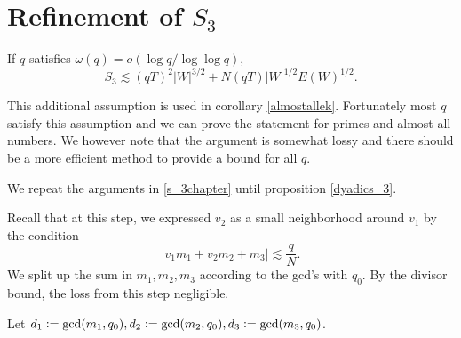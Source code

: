 \section{Refinement of $S_3$}

\begin{proposition} \label{s3refined}
   If $q$ satisfies $\omega(q)=o(\log q /\log\log q)$,
    \[
S_3 \lesssim (qT)^{2}| W|^{3/2}+N(qT)| W|^{1/2}E( W)^{1/2}.
\]
\end{proposition}
\begin{remark}
    This additional assumption is used in corollary \ref{almostallek}. Fortunately most $q$ satisfy this assumption and we can prove the statement for primes and almost all numbers. We however note that the argument is somewhat lossy and there should be a more efficient method to provide a bound for all $q$. 
\end{remark}
We repeat the arguments in \ref{s_3chapter} until proposition \ref{dyadics_3}.

Recall that at this step, we expressed $v_2$ as a small neighborhood around $v_1$ by the condition \[
|v_1m_1+v_2m_2+m_3|\lesssim \frac{q}{N}.
\] 
We split up the sum in $m_1,m_2,m_3$ according to the gcd's with $q_0$. By the divisor bound, the loss from this step negligible.

Let $d_1\mathrel{\mathop:}= \gcd (m_1,q_0),d_2\mathrel{\mathop:}= \gcd(m_2,q_0), d_3\mathrel{\mathop:}= \gcd (m_3,q_0)$. 


